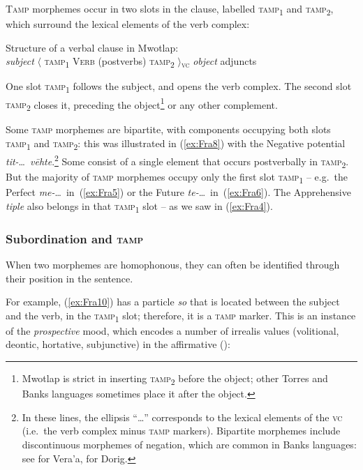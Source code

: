 \documentclass[output=paper,colorlinks,citecolor=brown]{langscibook}
\begin{document}
 
\textsc{Tamp} morphemes occur in two slots in the clause, labelled \textsc{tamp\textsubscript{1}} and \textsc{tamp\textsubscript{2}}, which surround the lexical elements of the verb complex: 
 

\ea \label{ex:Fra9} \textnormal{Structure of a verbal clause in Mwotlap: \\
\textit{subject} $\langle$ \textsc{tamp\textsubscript{1}} \textsc{Verb} (postverbs) \textsc{tamp\textsubscript{2}} $\rangle$\textsubscript{\textsc{vc}} \textit{object} adjuncts}
\z

\noindent One slot \textsc{tamp\textsubscript{1}} follows the subject, and opens the verb complex. The second slot \textsc{tamp\textsubscript{2}} closes it, preceding the object\footnote{Mwotlap is strict in inserting \textsc{tamp\textsubscript{2}} before the object; other Torres and Banks languages sometimes place it after the object.} or any other complement. 

Some \textsc{tamp} morphemes are bipartite, with components occupying both slots \textsc{tamp\textsubscript{1}} and \textsc{tamp\textsubscript{2}}: this was illustrated in (\ref{ex:Fra8}) with the Negative potential \textit{tit-}\ldots\  \textit{vēhte}.\footnote{In these lines, the ellipsis ``\ldots'' corresponds to the lexical elements of the \textsc{vc} (i.e.\ the verb complex minus \textsc{tamp} markers). Bipartite morphemes include discontinuous morphemes of negation, which are common in Banks languages: see \citet[31]{Schnell2011} for Vera'a, \citet{Françoisforthcominga} for Dorig.} Some consist of a single element that occurs postverbally in \textsc{tamp\textsubscript{2}}. But the majority of \textsc{tamp} morphemes occupy only the first slot \textsc{tamp\textsubscript{1}} -- e.g.\ the Perfect  \textit{me-}\ldots\ in~(\ref{ex:Fra5}) or the Future \textit{te-}\ldots\ in~(\ref{ex:Fra6}). The Apprehensive \textit{tiple} also belongs in that \textsc{tamp\textsubscript{1}} slot -- as we saw in (\ref{ex:Fra4}).

\subsubsection{Subordination and \textsc{tamp}}
\label{subsubsec:subandtamp}

When two morphemes are homophonous, they can often be identified through their position in the sentence. 

For example, (\ref{ex:Fra10}) has a particle \textit{so} that is located between the subject and the verb, in the \textsc{tamp\textsubscript{1}} slot; therefore, it is a \textsc{tamp} marker. This is an instance of the \textit{prospective} mood, which encodes a number of irrealis values (volitional, deontic, hortative, subjunctive) in the affirmative (\citealt[134]{François2005a}):
\end{document}
